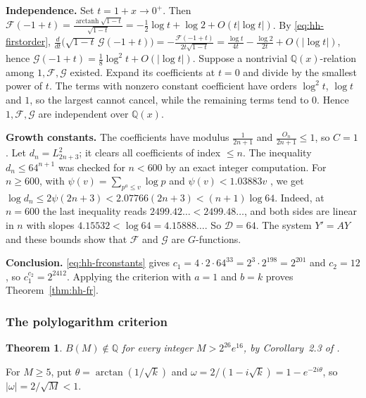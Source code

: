 \documentclass[oneside,english,11pt]{amsart}
\newtheorem{theorem}[thm]{Theorem}
\begin{document}
\textbf{Independence.} Set $t=1+x\to0^+$. Then
$\mathcal F(-1+t)=\frac{\operatorname{arctanh}\sqrt{1-t}}{\sqrt{1-t}}=-\frac12\log t+\log2+O(t|\log t|)$. By
\eqref{eq:hh-firstorder},
$\frac d{dt}\bigl(\sqrt{1-t}\,\mathcal G(-1+t)\bigr)=-\frac{\mathcal F(-1+t)}{2t\sqrt{1-t}}=\frac{\log t}{4t}-\frac{\log2}{2t}+O(|\log t|)$, hence
$\mathcal G(-1+t)=\frac18\log^2t+O(|\log t|)$. Suppose a nontrivial $\mathbb Q(x)$-relation among $1,\mathcal F,\mathcal G$ existed.
Expand its coefficients at $t=0$ and divide by the smallest power of $t$. The terms with nonzero constant
coefficient have orders $\log^2t$, $\log t$ and $1$, so the largest cannot cancel, while the remaining terms
tend to $0$. Hence $1,\mathcal F,\mathcal G$ are independent over $\mathbb Q(x)$.

\textbf{Growth constants.} The coefficients have modulus $\frac1{2n+1}$ and $\frac{O_n}{2n+1}\le1$, so $C=1$. Let
$d_n=L_{2n+3}^2$; it clears all coefficients of index $\le n$. The inequality $d_n\le64^{n+1}$ was checked for $n<600$ by an
exact integer computation. For $n\ge600$, with $\psi(v)=\sum_{p^a\le v}\log p$ and $\psi(v)<1.03883v$
\cite[Thm.~12, (3.35)]{rosser1962approximate}, we get $\log d_n\le2\psi(2n+3)<2.07766(2n+3)<(n+1)\log64$. Indeed, at $n=600$ the
last inequality reads $2499.42\ldots<2499.48\ldots$, and both sides are linear in $n$ with slopes $4.15532<\log64=4.15888\ldots$.
So $\mathcal D=64$. The system $Y'=AY$ and these bounds show that $\mathcal F$ and $\mathcal G$ are $G$-functions.

\textbf{Conclusion.} \eqref{eq:hh-frconstants} gives $c_1=4\cdot2\cdot64^{33}=2^3\cdot2^{198}=2^{201}$ and $c_2=12$, so $c_1^{c_2}=2^{2412}$.
Applying the criterion with $a=1$ and $b=k$ proves Theorem~\ref{thm:hh-fr}.

\subsubsection{The polylogarithm criterion}

\begin{theorem}\label{thm:hh-kaw}
$B(M)\notin\mathbb Q$ for every integer $M>2^{26}e^{16}$, by Corollary~2.3 of \cite{kawashima2026linear}.
\end{theorem}

For $M\ge5$, put $\theta=\arctan(1/\sqrt k)$ and $\omega=2/(1-i\sqrt k)=1-e^{-2i\theta}$, so $|\omega|=2/\sqrt M<1$.
\end{document}
